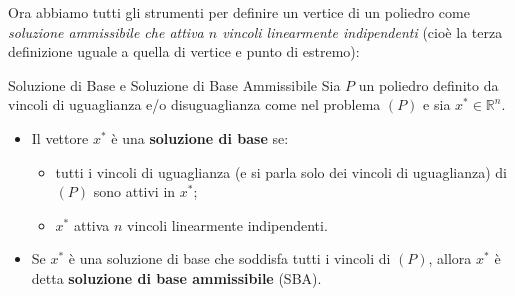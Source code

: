 Ora abbiamo tutti gli strumenti per definire un vertice di un poliedro come \textit{soluzione ammissibile che attiva $n$ vincoli linearmente indipendenti} (cioè la terza definizione uguale a quella
di vertice e punto di estremo):

\begin{definition}{Soluzione di Base e Soluzione di Base Ammissibile}
Sia $P$ un poliedro definito da vincoli di uguaglianza e/o disuguaglianza come nel problema $(P)$ e sia $x^* \in \mathbb{R}^n$.
\begin{itemize}[label=$\bullet$, leftmargin=2em]
    \item Il vettore $x^*$ è una \textbf{soluzione di base} se:
    \begin{itemize}[label=--, leftmargin=1.5em]
        \item tutti i vincoli di uguaglianza (e si parla solo dei vincoli di uguaglianza) di $(P)$ sono attivi in $x^*$;
        \item $x^*$ attiva $n$ vincoli linearmente indipendenti.
    \end{itemize}
    \item Se $x^*$ è una soluzione di base che soddisfa tutti i vincoli di $(P)$, allora $x^*$ è detta \textbf{soluzione di base ammissibile} (SBA).
\end{itemize}
\end{definition}

